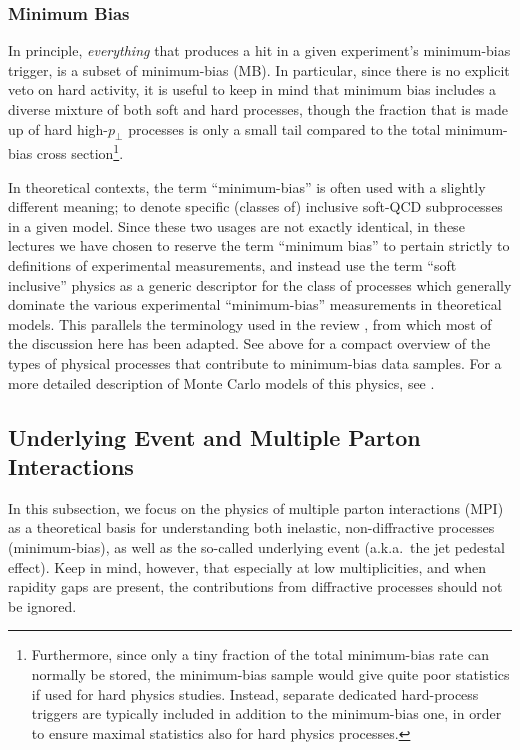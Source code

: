 \subsubsection{Minimum Bias \label{sec:MB}}
%
  In principle, \emph{everything} that produces a hit in a given
  experiment's minimum-bias trigger, is a subset of
minimum-bias (MB). In particular, since there is no explicit veto on
  hard activity, it is useful to keep in mind that 
minimum bias includes a diverse mixture of both soft and hard
  processes, though the  fraction that is made up of hard
  high-$p_\perp$ processes is only a small tail compared to the total
  minimum-bias cross section\footnote{
Furthermore, since only a tiny fraction of the total
minimum-bias rate can normally be stored, the minimum-bias sample
would give quite poor statistics if used for hard physics studies. Instead,
separate dedicated 
hard-process triggers are typically included in addition to the
minimum-bias one, in order to ensure maximal statistics also for hard
physics processes.}.

In theoretical contexts, 
the term ``minimum-bias'' is often used with a slightly different
meaning; to denote specific (classes of) inclusive soft-QCD
subprocesses in a given model. 
Since these two usages are not exactly identical, in these lectures 
we have chosen to reserve the term ``minimum bias''  to pertain strictly to
definitions of experimental measurements, and instead use  
the term ``soft inclusive'' physics as a generic descriptor for the
class of processes which generally dominate the various experimental
``minimum-bias'' measurements in theoretical models. This parallels
the terminology used in the review \cite{Buckley:2011ms}, from which
most of the discussion here has been adapted. 
See  above for a compact overview of the types of
physical processes that contribute to minimum-bias data samples.
For a more detailed description of Monte Carlo models of this physics, 
see \cite{Buckley:2011ms}.

\subsection{Underlying Event and Multiple Parton Interactions \label{sec:mpi}}

In this subsection, we focus on the physics of 
multiple parton interactions (MPI) as a theoretical basis for
understanding both inelastic, non-diffractive 
processes (minimum-bias), as well as the so-called underlying event
(a.k.a.\ the jet pedestal effect). 
Keep in mind, however, that especially at low
multiplicities, and when rapidity gaps are present, the contributions from
diffractive processes should not be ignored.


